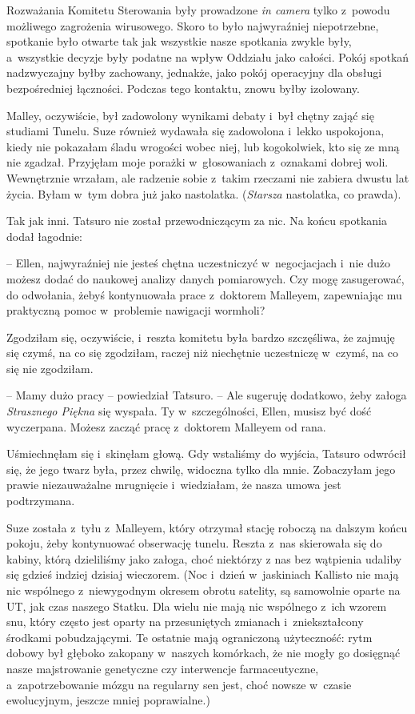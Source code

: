 \documentclass[oneside,polish,11pt,sfheadings]{mwbk}
\begin{document}
Rozważania Komitetu Sterowania były prowadzone \textit{in camera} tylko z~powodu możliwego zagrożenia wirusowego. Skoro to było najwyraźniej
niepotrzebne, spotkanie było otwarte tak jak wszystkie nasze spotkania
zwykle były, a~wszystkie decyzje były podatne na wpływ Oddziału jako
całości. Pokój spotkań nadzwyczajny byłby zachowany, jednakże, jako
pokój operacyjny dla obsługi bezpośredniej łączności. Podczas tego
kontaktu, znowu byłby izolowany.

Malley, oczywiście, był zadowolony wynikami debaty i~był chętny zająć
się studiami Tunelu. Suze również wydawała się zadowolona i~lekko
uspokojona, kiedy nie pokazałam śladu wrogości wobec niej, lub
kogokolwiek, kto się ze mną nie zgadzał. Przyjęłam moje porażki w~głosowaniach z~oznakami dobrej woli. Wewnętrznie wrzałam, ale radzenie
sobie z~takim rzeczami nie zabiera dwustu lat życia. Byłam w~tym dobra
już jako nastolatka. (\textit{Starsza} nastolatka, co prawda).

Tak jak inni. Tatsuro nie został przewodniczącym za nic. Na końcu
spotkania dodał łagodnie:

-- Ellen, najwyraźniej nie jesteś chętna uczestniczyć w~negocjacjach i~nie dużo możesz dodać do naukowej analizy danych pomiarowych. Czy mogę
zasugerować, do odwołania, żebyś kontynuowała prace z~doktorem Malleyem,
zapewniając mu praktyczną pomoc w~problemie nawigacji wormholi?

Zgodziłam się, oczywiście, i~reszta komitetu była bardzo szczęśliwa, że
zajmuję się czymś, na co się zgodziłam, raczej niż niechętnie
uczestniczę w~czymś, na co się nie zgodziłam.

-- Mamy dużo pracy -- powiedział Tatsuro. -- Ale sugeruję dodatkowo, żeby
załoga \textit{Strasznego Piękna} się wyspała. Ty w~szczególności, Ellen,
musisz być dość wyczerpana. Możesz zacząć pracę z~doktorem Malleyem od
rana.

Uśmiechnęłam się i~skinęłam głową. Gdy wstaliśmy do wyjścia, Tatsuro
odwrócił się, że jego twarz była, przez chwilę, widoczna tylko dla mnie.
Zobaczyłam jego prawie niezauważalne mrugnięcie i~wiedziałam, że nasza
umowa jest podtrzymana.

Suze została z~tyłu z~Malleyem, który otrzymał stację roboczą na dalszym
końcu pokoju, żeby kontynuować obserwację tunelu. Reszta z~nas
skierowała się do kabiny, którą dzieliliśmy jako załoga, choć niektórzy
z nas bez wątpienia udaliby się gdzieś indziej dzisiaj wieczorem. (Noc i~dzień w~jaskiniach Kallisto nie mają nic wspólnego z~niewygodnym okresem
obrotu satelity, są samowolnie oparte na UT, jak czas naszego Statku.
Dla wielu nie mają nic wspólnego z~ich wzorem snu, który często jest
oparty na przesuniętych zmianach i~zniekształcony środkami
pobudzającymi. Te ostatnie mają ograniczoną użyteczność: rytm dobowy był
głęboko zakopany w~naszych komórkach, że nie mogły go dosięgnąć nasze
majstrowanie genetyczne czy interwencje farmaceutyczne, a~zapotrzebowanie mózgu na regularny sen jest, choć nowsze w~czasie
ewolucyjnym, jeszcze mniej poprawialne.)
\end{document}
